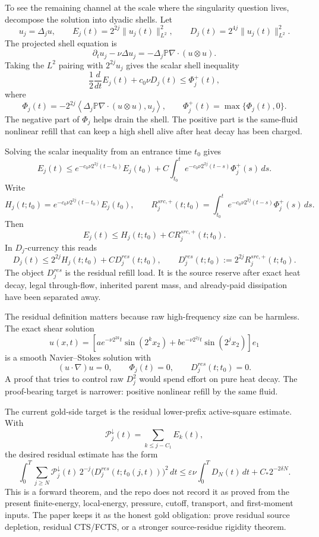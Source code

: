 To see the remaining channel at the scale where the singularity question
lives, decompose the solution into dyadic shells.  Let
\[
  u_j=\Delta_j u,\qquad
  E_j(t)=2^{2j}\|u_j(t)\|_{L^2}^2,\qquad
  D_j(t)=2^{4j}\|u_j(t)\|_{L^2}^2.
\]
The projected shell equation is
\[
  \partial_tu_j-\nu\Delta u_j
  =
  -\Delta_j\mathbb P\nabla\cdot(u\otimes u).
\]
Taking the \(L^2\) pairing with \(2^{2j}u_j\) gives the scalar shell
inequality
\[
  \frac12\frac{d}{dt}E_j(t)+c_0\nu D_j(t)
  \le \Phi_j^+(t),
\]
where
\[
  \Phi_j(t)
  =
  -2^{2j}
  \left\langle
  \Delta_j\mathbb P\nabla\cdot(u\otimes u),u_j
  \right\rangle,
  \qquad
  \Phi_j^+(t)=\max\{\Phi_j(t),0\}.
\]
The negative part of \(\Phi_j\) helps drain the shell.  The positive part is
the same-fluid nonlinear refill that can keep a high shell alive after heat
decay has been charged.

Solving the scalar inequality from an entrance time \(t_0\) gives
\[
  E_j(t)
  \le
  e^{-c_0\nu2^{2j}(t-t_0)}E_j(t_0)
  +C\int_{t_0}^t
    e^{-c_0\nu2^{2j}(t-s)}\Phi_j^+(s)\,ds.
\]
Write
\[
  H_j(t;t_0)
  =
  e^{-c_0\nu2^{2j}(t-t_0)}E_j(t_0),
  \qquad
  R_j^{src,+}(t;t_0)
  =
  \int_{t_0}^t
    e^{-c_0\nu2^{2j}(t-s)}\Phi_j^+(s)\,ds.
\]
Then
\[
  E_j(t)\le H_j(t;t_0)+C R_j^{src,+}(t;t_0).
\]
In \(D_j\)-currency this reads
\[
  D_j(t)
  \le
  2^{2j}H_j(t;t_0)+C D_j^{res}(t;t_0),
  \qquad
  D_j^{res}(t;t_0):=2^{2j}R_j^{src,+}(t;t_0).
\]
The object \(D_j^{res}\) is the residual refill load.  It is the source
reserve after exact heat decay, legal through-flow, inherited parent mass,
and already-paid dissipation have been separated away.

The residual definition matters because raw high-frequency size can be
harmless.  The exact shear solution
\[
  u(x,t)
  =
  \left[
    a e^{-\nu2^{2k}t}\sin(2^kx_2)
    +
    b e^{-\nu2^{2j}t}\sin(2^jx_2)
  \right]e_1
\]
is a smooth Navier--Stokes solution with
\[
  (u\cdot\nabla)u=0,\qquad
  \Phi_j(t)=0,\qquad
  D_j^{res}(t;t_0)=0.
\]
A proof that tries to control raw \(D_j^2\) would spend effort on pure heat
decay.  The proof-bearing target is narrower: positive nonlinear refill by
the same fluid.

The current gold-side target is the residual lower-prefix active-square
estimate.  With
\[
  \mathcal P_j^\downarrow(t)=\sum_{k\le j-C_1}E_k(t),
\]
the desired residual estimate has the form
\[
  \int_0^T
  \sum_{j\ge N}
  \mathcal P_j^\downarrow(t)\,
  2^{-j}
  \bigl(D_j^{res}(t;t_0(j,t))\bigr)^2\,dt
  \le
  \varepsilon\nu\int_0^TD_N(t)\,dt
  +C_*2^{-2\delta N}.
\]
This is a forward theorem, and the repo does not record it as proved from
the present finite-energy, local-energy, pressure, cutoff, transport, and
first-moment inputs.  The paper keeps it as the honest gold obligation: prove
residual source depletion, residual CTS/FCTS, or a stronger source-residue
rigidity theorem.

